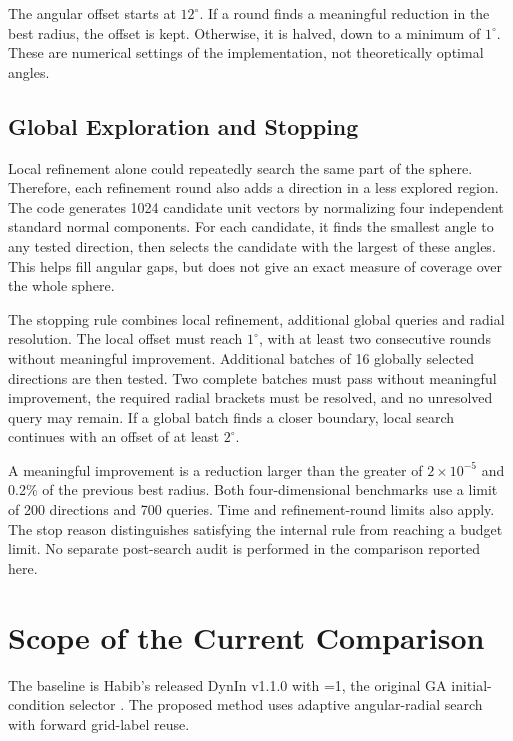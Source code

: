 The angular offset starts at $12^\circ$. If a round finds a meaningful reduction in the best radius, the offset is kept. Otherwise, it is halved, down to a minimum of $1^\circ$. These are numerical settings of the implementation, not theoretically optimal angles.

\subsection{Global Exploration and Stopping}

Local refinement alone could repeatedly search the same part of the sphere. Therefore, each refinement round also adds a direction in a less explored region. The code generates 1024 candidate unit vectors by normalizing four independent standard normal components. For each candidate, it finds the smallest angle to any tested direction, then selects the candidate with the largest of these angles. This helps fill angular gaps, but does not give an exact measure of coverage over the whole sphere.

The stopping rule combines local refinement, additional global queries and radial resolution. The local offset must reach $1^\circ$, with at least two consecutive rounds without meaningful improvement. Additional batches of 16 globally selected directions are then tested. Two complete batches must pass without meaningful improvement, the required radial brackets must be resolved, and no unresolved query may remain. If a global batch finds a closer boundary, local search continues with an offset of at least $2^\circ$.

A meaningful improvement is a reduction larger than the greater of $2\times10^{-5}$ and 0.2\% of the previous best radius. Both four-dimensional benchmarks use a limit of 200 directions and 700 queries. Time and refinement-round limits also apply. The stop reason distinguishes satisfying the internal rule from reaching a budget limit. No separate post-search audit is performed in the comparison reported here.

\section{Scope of the Current Comparison}

The baseline is Habib's released DynIn v1.1.0 with =1, the original GA initial-condition selector \cite{ref12}. The proposed method uses adaptive angular-radial search with forward grid-label reuse.


